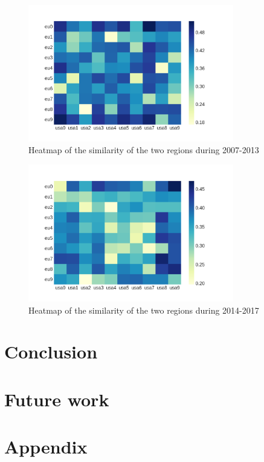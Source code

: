 \documentclass[12pt]{report}
\begin{document}
\begin{figure}
\centering
\includegraphics[width=0.8\textwidth]
{figs/heatmaps/heatmapFP7.png}
\caption{Heatmap of the similarity of the two regions during 2007-2013}
\end{figure}
\begin{figure}
\centering
\includegraphics[width=0.8\textwidth]
{figs/heatmaps/heatmapH2020.png}
\caption{Heatmap of the similarity of the two regions during 2014-2017}
\end{figure}

\section{Conclusion}

\section{Future work}

{}



\clearpage
\section{Appendix}
\end{document}
